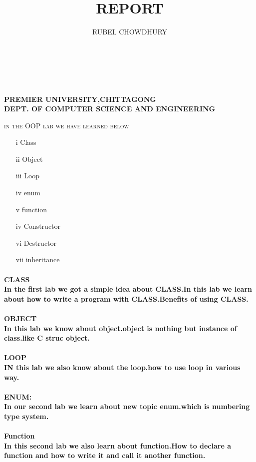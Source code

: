 \documentclass[12pt]{article}
\title{REPORT}
\author{RUBEL CHOWDHURY}
\begin{document}
 \textbf{\\ \\ \\ \center PREMIER UNIVERSITY,CHITTAGONG \\}
 \textbf{DEPT. OF COMPUTER SCIENCE AND ENGINEERING}
 \maketitle
   \newpage
     \textsc{in the OOP lab we have learned below \\}
   \begin{itemize}
   \item[i]  Class \item[ii] Object \item[iii] Loop  \item[iv] enum \item[v] function \item[iv]Constructor \item[vi] Destructor \item[vii]inheritance
  \end{itemize}
  \bigskip \bigskip \bigskip \bigskip
   \paragraph{CLASS \\
   In the first lab we got a simple idea about CLASS.In this lab we learn about how to write a program with CLASS.Benefits of using  CLASS.}
  \paragraph{OBJECT\\
  In this lab we know about object.object is nothing but instance of class.like C struc object. 
  }
\paragraph{LOOP\\
IN this lab we also know about the loop.how to use loop in various way.
} 
   \paragraph{ENUM:\\
   In our second lab we learn about new topic enum.which is numbering type system.}
  \paragraph{Function\\
  In this second lab we also learn about function.How to declare a function and how to write it and call it another function. 
  } 
\end{document}
